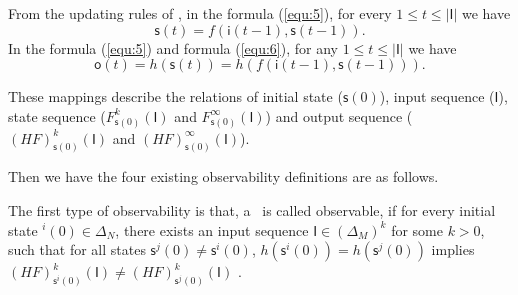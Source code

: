   
  
  From the updating rules of \BCNs, in the formula (\ref{equ:5}), for every $1\le t \le |\mathsf{I}|$ we have 
 \[\mathsf{s}(t)=f(\mathsf{i}(t-1),\mathsf{s}(t-1)).\] 
 In the formula (\ref{equ:5}) and formula (\ref{equ:6}), for any $1\le t \le |\mathsf{I}|$ we have  
 \[\mathsf{o}(t)=h(\mathsf{s}(t))=h(f(\mathsf{i}(t-1),\mathsf{s}(t-1))).\] 

These mappings describe the relations of initial state ($\mathsf{s}(0)$), input sequence ($\mathsf{I}$), state sequence ($F^k_{\mathsf{s}(0)}(\mathsf{I})$ and $F^{\infty}_{\mathsf{s}(0)}(\mathsf{I})$) and output sequence ($(HF)^k_{\mathsf{s}(0)}(\mathsf{I})$ and $(HF)^{\infty}_{\mathsf{s}(0)}(\mathsf{I})$). 

Then we have the four existing observability definitions are as follows.

\begin{definition} 
The first type of observability is that, a \BCN\ is called observable, if for every initial state \State$^{i}(0)$$\in \Delta_N$, there exists an input sequence $\mathsf{I}\in(\Delta_M)^k$ for some $k>0$, such that for all states $\mathsf{s}^{j}(0)\neq \mathsf{s}^{i}(0)$, $h(\mathsf{s}^{i}(0))=h(\mathsf{s}^{j}(0))$ implies $(HF)^k_{\mathsf{s}^{i}(0)}(\mathsf{I})\neq (HF)^k_{{\mathsf{s}^{j}(0)}}(\mathsf{I})$ \cite{cheng2009controllability}.
\end{definition}

